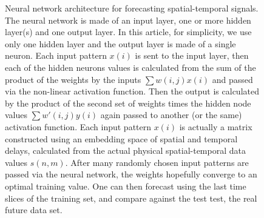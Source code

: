 \documentclass[journal]{IEEEtran}
\begin{document}
\begin{figure}[!htb]
\caption{Neural network architecture for forecasting spatial-temporal signals. 
The neural network is made of an input layer, one or more hidden layer(s) and one output layer.
In this article, for simplicity, we use only one hidden layer and the output layer is made of a single neuron. 
Each input pattern $x(i)$ is sent to the
input layer, then each of the hidden neurons values is calculated from the sum of the product of the weights by the inputs $\sum w(i,j) x(i)$
and passed via the non-linear activation function. Then the output is calculated by the product of the second set of
weights times the hidden node values $\sum w'(i,j) y(i)$ again passed to another (or the same) activation function.
Each input pattern $x(i)$ is actually a matrix constructed using an embedding space of
spatial and temporal delays, calculated from the actual physical spatial-temporal data values $s(n,m)$. After many randomly chosen input patterns
are passed via the neural network, the weights hopefully converge to an optimal training value. One can then forecast using the last
time slices of the training set, and compare against the test test, the real future data set.}
\label{architecture}
\end{figure}
\end{document}
